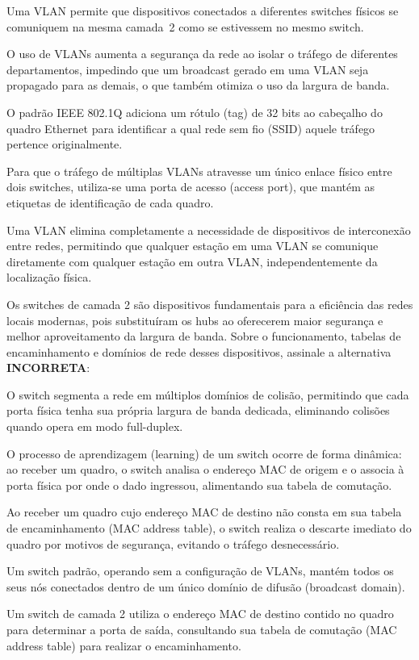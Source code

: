 \documentclass[11pt, addpoints]{modelo/prova2}
\begin{document}
    \begin{choices}
        \item Uma VLAN permite que dispositivos conectados a diferentes switches físicos se comuniquem na mesma camada~2 como se estivessem no mesmo switch.
        \item O uso de VLANs aumenta a segurança da rede ao isolar o tráfego de diferentes departamentos, impedindo que um broadcast gerado em uma VLAN seja propagado para as demais, o que também otimiza o uso da largura de banda.
        \item O padrão IEEE 802.1Q adiciona um rótulo (tag) de 32 bits ao cabeçalho do quadro Ethernet para identificar a qual rede sem fio (SSID) aquele tráfego pertence originalmente.
        \item Para que o tráfego de múltiplas VLANs atravesse um único enlace físico entre dois switches, utiliza-se uma porta de acesso (access port), que mantém as etiquetas de identificação de cada quadro.
        \item Uma VLAN elimina completamente a necessidade de dispositivos de interconexão entre redes, permitindo que qualquer estação em uma VLAN se comunique diretamente com qualquer estação em outra VLAN, independentemente da localização física.
    \end{choices} 
\question[0.5] Os switches de camada 2 são dispositivos fundamentais para a eficiência das redes locais modernas, pois substituíram os hubs ao oferecerem maior segurança e melhor aproveitamento da largura de banda. Sobre o funcionamento, tabelas de encaminhamento e domínios de rede desses dispositivos, assinale a alternativa \textbf{INCORRETA}:
    \begin{choices}
        \item O switch segmenta a rede em múltiplos domínios de colisão, permitindo que cada porta física tenha sua própria largura de banda dedicada, eliminando colisões quando opera em modo full-duplex.
        \item O processo de aprendizagem (learning) de um switch ocorre de forma dinâmica: ao receber um quadro, o switch analisa o endereço MAC de origem e o associa à porta física por onde o dado ingressou, alimentando sua tabela de comutação.
        \item Ao receber um quadro cujo endereço MAC de destino não consta em sua tabela de encaminhamento (MAC address table), o switch realiza o descarte imediato do quadro por motivos de segurança, evitando o tráfego desnecessário.
        \item Um switch padrão, operando sem a configuração de VLANs, mantém todos os seus nós conectados dentro de um único domínio de difusão (broadcast domain).
        \item Um switch de camada 2 utiliza o endereço MAC de destino contido no quadro para determinar a porta de saída, consultando sua tabela de comutação (MAC address table) para realizar o encaminhamento.
    \end{choices} 
\end{document}
